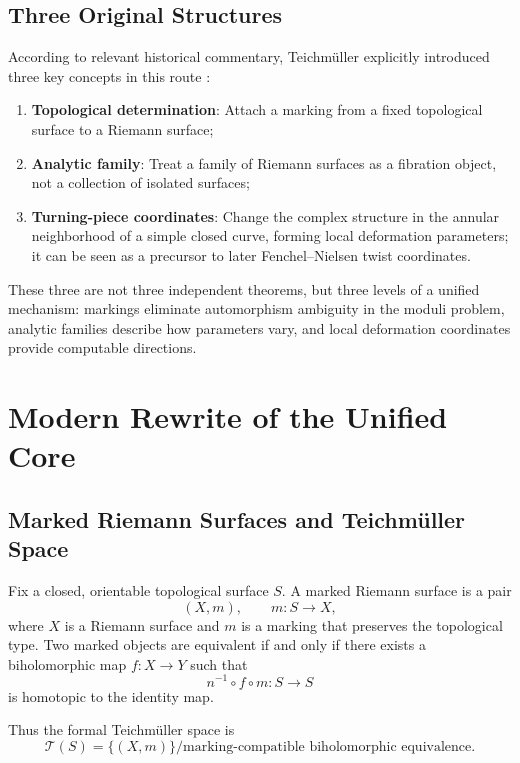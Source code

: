 \documentclass[UTF8,a4paper,11pt]{article}
\begin{document}
\subsection{Three Original Structures}

According to relevant historical commentary, Teichmüller explicitly introduced three key concepts in this route \cite{ACampo2012}:

\begin{enumerate}[label=(\arabic*)]
  \item \textbf{Topological determination}: Attach a marking from a fixed topological surface to a Riemann surface;
  \item \textbf{Analytic family}: Treat a family of Riemann surfaces as a fibration object, not a collection of isolated surfaces;
  \item \textbf{Turning-piece coordinates}: Change the complex structure in the annular neighborhood of a simple closed curve, forming local deformation parameters; it can be seen as a precursor to later Fenchel--Nielsen twist coordinates.
\end{enumerate}

These three are not three independent theorems, but three levels of a unified mechanism: markings eliminate automorphism ambiguity in the moduli problem, analytic families describe how parameters vary, and local deformation coordinates provide computable directions.

\section{Modern Rewrite of the Unified Core}

\subsection{Marked Riemann Surfaces and Teichmüller Space}

Fix a closed, orientable topological surface $S$. A marked Riemann surface is a pair
\[
  (X,m),\qquad m:S\longrightarrow X,
\]
where $X$ is a Riemann surface and $m$ is a marking that preserves the topological type. Two marked objects are equivalent if and only if there exists a biholomorphic map $f:X\to Y$ such that
\[
  n^{-1}\circ f\circ m:S\longrightarrow S
\]
is homotopic to the identity map.

Thus the formal Teichmüller space is
\[
  \mathcal T(S)
  =\{(X,m)\}/\text{marking-compatible biholomorphic equivalence}.
\]
\end{document}
